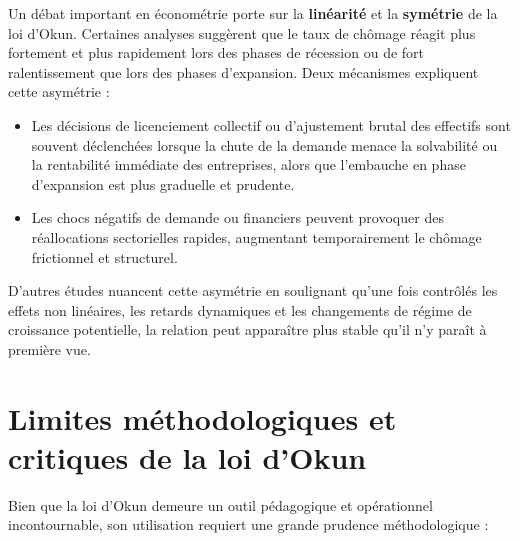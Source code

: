 \documentclass[11pt,a4paper]{article}
\begin{document}
Un débat important en économétrie porte sur la \textbf{linéarité} et la \textbf{symétrie} de la loi d'Okun. Certaines analyses suggèrent que le taux de chômage réagit plus fortement et plus rapidement lors des phases de récession ou de fort ralentissement que lors des phases d'expansion. Deux mécanismes expliquent cette asymétrie :
\begin{itemize}[leftmargin=1.5em]
    \item Les décisions de licenciement collectif ou d'ajustement brutal des effectifs sont souvent déclenchées lorsque la chute de la demande menace la solvabilité ou la rentabilité immédiate des entreprises, alors que l'embauche en phase d'expansion est plus graduelle et prudente.
    \item Les chocs négatifs de demande ou financiers peuvent provoquer des réallocations sectorielles rapides, augmentant temporairement le chômage frictionnel et structurel.
\end{itemize}

D'autres études nuancent cette asymétrie en soulignant qu'une fois contrôlés les effets non linéaires, les retards dynamiques et les changements de régime de croissance potentielle, la relation peut apparaître plus stable qu'il n'y paraît à première vue.

\section{Limites méthodologiques et critiques de la loi d'Okun}

Bien que la loi d'Okun demeure un outil pédagogique et opérationnel incontournable, son utilisation requiert une grande prudence méthodologique :
\end{document}
